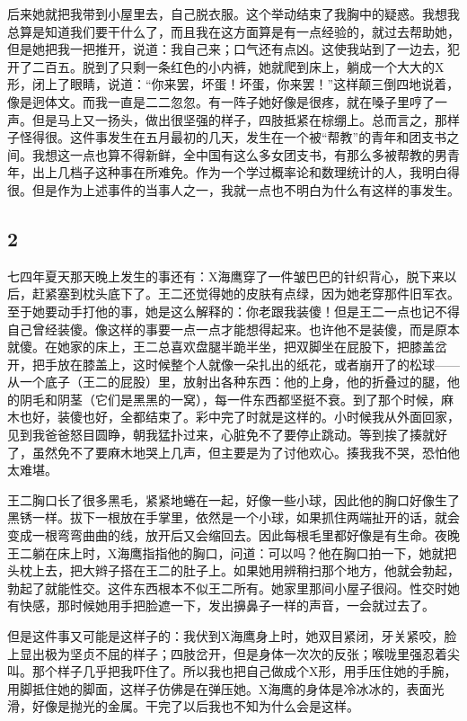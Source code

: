 后来她就把我带到小屋里去，自己脱衣服。这个举动结束了我胸中的疑惑。我想我总算是知道我们要干什么了，而且我在这方面算是有一点经验的，就过去帮助她，但是她把我一把推开，说道：我自己来；口气还有点凶。这使我站到了一边去，犯开了二百五。脱到了只剩一条红色的小内裤，她就爬到床上，躺成一个大大的X形，闭上了眼睛，说道：“你来罢，坏蛋！坏蛋，你来罢！”这样颠三倒四地说着，像是迥体文。而我一直是二二忽忽。有一阵子她好像是很疼，就在嗓子里哼了一声。但是马上又一扬头，做出很坚强的样子，四肢抵紧在棕绷上。总而言之，那样子怪得很。这件事发生在五月最初的几天，发生在一个被“帮教”的青年和团支书之间。我想这一点也算不得新鲜，全中国有这么多女团支书，有那么多被帮教的男青年，出上几档子这种事在所难免。作为一个学过概率论和数理统计的人，我明白得很。但是作为上述事件的当事人之一，我就一点也不明白为什么有这样的事发生。 

\subsection{2} 

七四年夏天那天晚上发生的事还有：X海鹰穿了一件皱巴巴的针织背心，脱下来以后，赶紧塞到枕头底下了。王二还觉得她的皮肤有点绿，因为她老穿那件旧军衣。至于她要动手打他的事，她是这么解释的：你老跟我装傻！但是王二一点也记不得自己曾经装傻。像这样的事要一点一点才能想得起来。也许他不是装傻，而是原本就傻。在她家的床上，王二总喜欢盘腿半跪半坐，把双脚坐在屁股下，把膝盖岔开，把手放在膝盖上，这时候整个人就像一朵扎出的纸花，或者崩开了的松球——从一个底子（王二的屁股）里，放射出各种东西：他的上身，他的折叠过的腿，他的阴毛和阴茎（它们是黑黑的一窝），每一件东西都坚挺不衰。到了那个时候，麻木也好，装傻也好，全都结束了。彩中完了时就是这样的。小时候我从外面回家，见到我爸爸怒目圆睁，朝我猛扑过来，心脏免不了要停止跳动。等到挨了揍就好了，虽然免不了要麻木地哭上几声，但主要是为了讨他欢心。揍我我不哭，恐怕他太难堪。 

王二胸口长了很多黑毛，紧紧地蜷在一起，好像一些小球，因此他的胸口好像生了黑锈一样。拔下一根放在手掌里，依然是一个小球，如果抓住两端扯开的话，就会变成一根弯弯曲曲的线，放开后又会缩回去。因此每根毛里都好像是有生命。夜晚王二躺在床上时，X海鹰指指他的胸口，问道：可以吗？他在胸口拍一下，她就把头枕上去，把大辫子搭在王二的肚子上。如果她用辨稍扫那个地方，他就会勃起，勃起了就能性交。这件东西根本不似王二所有。她家里那间小屋子很闷。性交时她有快感，那时候她用手把脸遮一下，发出擤鼻子一样的声音，一会就过去了。 

但是这件事又可能是这样子的：我伏到X海鹰身上时，她双目紧闭，牙关紧咬，脸上显出极为坚贞不屈的样子；四肢岔开，但是身体一次次的反张；喉咙里强忍着尖叫。那个样子几乎把我吓住了。所以我也把自己做成个X形，用手压住她的手腕，用脚抵住她的脚面，这样子仿佛是在弹压她。X海鹰的身体是冷冰冰的，表面光滑，好像是抛光的金属。干完了以后我也不知为什么会是这样。 

